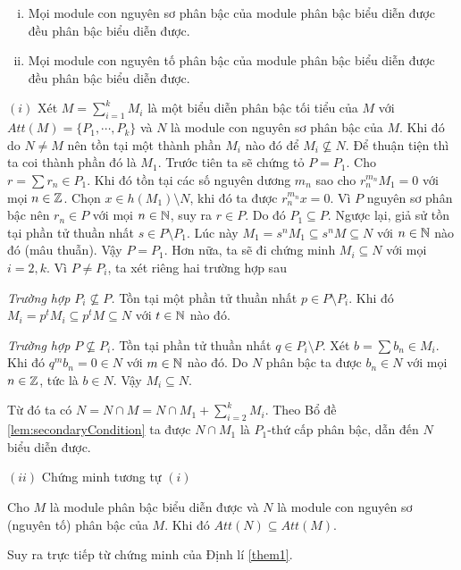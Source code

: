 \begin{theorem}\quad\vspace{-6pt}
    \label{them1}
    \begin{enumerate}[(i)]
        \item Mọi module con nguyên sơ phân bậc của module phân bậc biểu diễn được đều phân bậc biểu diễn được.
        \item Mọi module con nguyên tố phân bậc của module phân bậc biểu diễn được đều phân bậc biểu diễn được.
    \end{enumerate}
\end{theorem}
\startproof $(i)$ Xét $M = \sum_{i=1}^k M_i$ là một biểu diễn phân bậc tối tiểu của $M$ với $Att(M)=\{P_1,\cdots,P_k\}$ và $N$ là module con nguyên sơ phân bậc của $M$. Khi đó do $N \neq M$ nên tồn tại một thành phần $M_i$ nào đó để $M_i \not\subseteq N$. Để thuận tiện thì ta coi thành phần đó là $M_1$. Trước tiên ta sẽ chứng tỏ $P = P_1$. Cho $r = \sum r_n \in P_1$. Khi đó tồn tại các số nguyên dương $m_n$ sao cho $r_n^{m_n}M_1 = 0$ với mọi $n \in \mathbb Z$. Chọn $x \in h(M_1) \setminus N$, khi đó ta được $r_n^{m_n}x = 0$. Vì $P$ nguyên sơ phân bậc nên $r_n \in P$ với mọi $n \in \mathbb N$, suy ra $r \in P$. Do đó $P_1 \subseteq P$. Ngược lại, giả sử tồn tại phần tử thuần nhất $s \in P \setminus P_1$. Lúc này $M_1 = s^nM_1 \subseteq s^nM \subseteq N$ với $n \in \mathbb N$ nào đó (mâu thuẫn). Vậy $P = P_1$. Hơn nữa, ta sẽ đi chứng minh $M_i \subseteq N$ với mọi $i=2,k$. Vì $P \neq P_i$, ta xét riêng hai trường hợp sau

\textit{Trường hợp $P_i \not\subseteq P$.} Tồn tại một phần tử thuần nhất $p \in P \setminus P_i$. Khi đó $M_i = p^tM_i \subseteq p^tM \subseteq N$ với $t \in \mathbb N$ nào đó.

\textit{Trường hợp $P \not\subseteq P_i$.} Tồn tại phần tử thuần nhất $q \in P_i \setminus P$. Xét $b = \sum b_n \in M_i$. Khi đó $q^mb_n = 0 \in N$ với $m \in \mathbb N$ nào đó. Do $N$ phân bậc ta được $b_n \in N$ với mọi $n \in \mathbb Z$, tức là $b \in N$. Vậy $M_i \subseteq N$.

Từ đó ta có $N = N \cap M = N \cap M_1 + \sum_{i=2}^k M_i$. Theo Bổ đề \ref{lem:secondaryCondition} ta được $N \cap M_1$ là $P_1$-thứ cấp phân bậc, dẫn đến $N$ biểu diễn được.

\noindent
$(ii)$ Chứng minh tương tự $(i)$\QED

\begin{corollary}
    Cho $M$ là module phân bậc biểu diễn được và $N$ là module con nguyên sơ (nguyên tố) phân bậc của $M$. Khi đó $Att(N) \subseteq Att(M)$.
\end{corollary}
\startproof Suy ra trực tiếp từ chứng minh của Định lí \ref{them1}.

